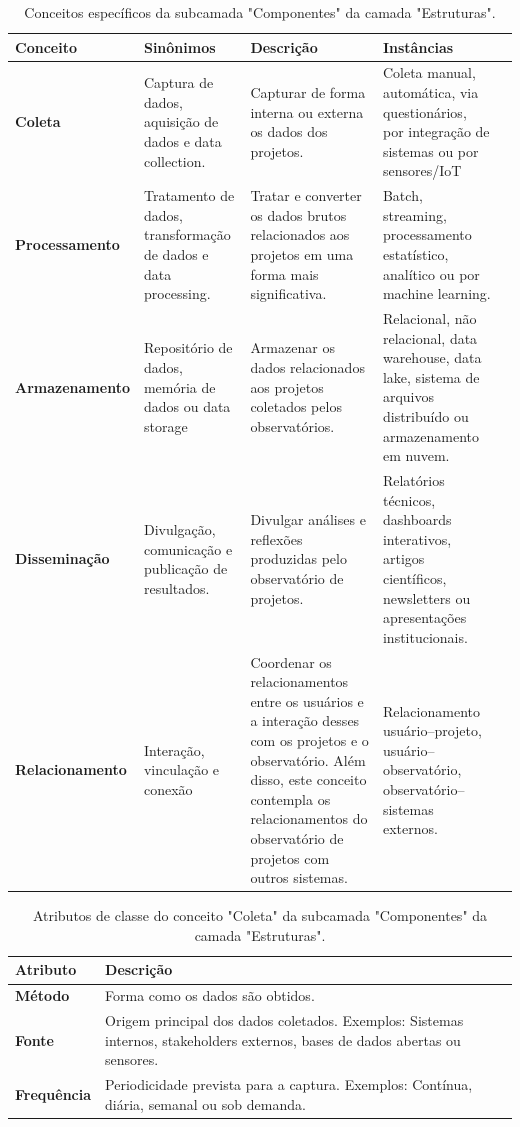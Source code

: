 \begin{apendicesenv}
\begin{table}[H]
\centering
\caption{Conceitos específicos da subcamada "Componentes" da camada "Estruturas".}
\begin{tabularx}{\textwidth}{|l|X|X|X|X|}
\hline
\textbf{Conceito} & \textbf{Sinônimos} & \textbf{Descrição} & \textbf{Instâncias} \\ \hline
\textbf{Coleta} & Captura de dados, aquisição de dados e data collection. & Capturar de forma interna ou externa os dados dos projetos. & Coleta manual, automática, via questionários, por integração de sistemas ou por sensores/IoT\\ \hline
\textbf{Processamento} & Tratamento de dados, transformação de dados e data processing. & Tratar e converter os dados brutos relacionados aos projetos em uma forma mais significativa. & Batch, streaming, processamento estatístico, analítico ou por machine learning.\\ \hline
\textbf{Armazenamento}  & Repositório de dados, memória de dados ou data storage & Armazenar os dados relacionados aos projetos coletados pelos observatórios. & Relacional, não relacional, data warehouse, data lake, sistema de arquivos distribuído ou armazenamento em nuvem. \\ \hline
\textbf{Disseminação}  & Divulgação, comunicação e publicação de resultados. & Divulgar análises e reflexões produzidas pelo observatório de projetos. & Relatórios técnicos, dashboards interativos, artigos científicos, newsletters ou apresentações institucionais.\\ \hline
\textbf{Relacionamento} & Interação, vinculação e conexão & Coordenar os relacionamentos entre os usuários e a interação desses com os projetos e o observatório. Além disso, este conceito contempla os relacionamentos do observatório de projetos com outros sistemas. & Relacionamento usuário–projeto, usuário–observatório, observatório–sistemas externos. \\ \hline
\end{tabularx}
\end{table}

\begin{table}[H]
\centering
\caption{Atributos de classe do conceito "Coleta" da subcamada "Componentes" da camada "Estruturas".}
\begin{tabularx}{\textwidth}{|l|X|X|}
\hline
\textbf{Atributo} & \textbf{Descrição} \\ \hline
\textbf{Método} & Forma como os dados são obtidos.\\ \hline
\textbf{Fonte} & Origem principal dos dados coletados. Exemplos: Sistemas internos, stakeholders externos, bases de dados abertas ou sensores.\\ \hline
\textbf{Frequência} & Periodicidade prevista para a captura. Exemplos: Contínua, diária, semanal ou sob demanda. \\ \hline
\end{tabularx}
\end{table}


\end{apendicesenv}
